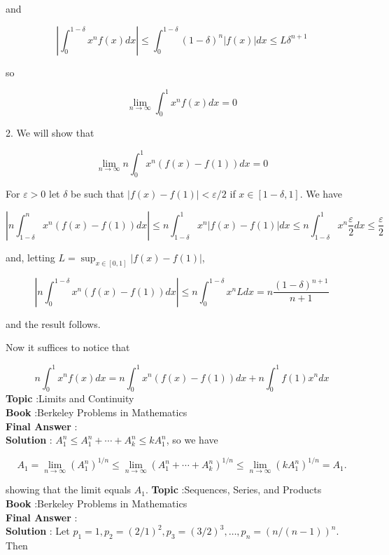 \documentclass[10pt]{article}
\begin{document}
and

$$
\left|\int_{0}^{1-\delta} x^{n} f(x) d x\right| \leqslant \int_{0}^{1-\delta}(1-\delta)^{n}|f(x)| d x \leqslant L \delta^{n+1}
$$

so

$$
\lim _{n \rightarrow \infty} \int_{0}^{1} x^{n} f(x) d x=0
$$

2. We will show that

$$
\lim _{n \rightarrow \infty} n \int_{0}^{1} x^{n}(f(x)-f(1)) d x=0
$$

For $\varepsilon>0$ let $\delta$ be such that $|f(x)-f(1)|<\varepsilon / 2$ if $x \in[1-\delta, 1]$. We have

$$
\left|n \int_{1-\delta}^{n} x^{n}(f(x)-f(1)) d x\right| \leqslant n \int_{1-\delta}^{1} x^{n}|f(x)-f(1)| d x \leqslant n \int_{1-\delta}^{1} x^{n} \frac{\varepsilon}{2} d x \leqslant \frac{\varepsilon}{2}
$$

and, letting $L=\sup _{x \in[0,1]}|f(x)-f(1)|$,

$$
\left|n \int_{0}^{1-\delta} x^{n}(f(x)-f(1)) d x\right| \leqslant n \int_{0}^{1-\delta} x^{n} L d x=n \frac{(1-\delta)^{n+1}}{n+1}
$$

and the result follows.

Now it suffices to notice that

$$
n \int_{0}^{1} x^{n} f(x) d x=n \int_{0}^{1} x^{n}(f(x)-f(1)) d x+n \int_{0}^{1} f(1) x^{n} d x
$$
\textbf{Topic} :Limits and Continuity \\
\textbf{Book} :Berkeley Problems in Mathematics\\
\textbf{Final Answer} :\\


\textbf{Solution} : $A_{1}^{n} \leqslant A_{1}^{n}+\cdots+A_{k}^{n} \leqslant k A_{1}^{n}$, so we have

$$
A_{1}=\lim _{n \rightarrow \infty}\left(A_{1}^{n}\right)^{1 / n} \leqslant \lim _{n \rightarrow \infty}\left(A_{1}^{n}+\cdots+A_{k}^{n}\right)^{1 / n} \leqslant \lim _{n \rightarrow \infty}\left(k A_{1}^{n}\right)^{1 / n}=A_{1} .
$$

showing that the limit equals $A_{1}$.
\textbf{Topic} :Sequences, Series, and Products \\
\textbf{Book} :Berkeley Problems in Mathematics\\
\textbf{Final Answer} :\\


\textbf{Solution} : Let $p_{1}=1, p_{2}=(2 / 1)^{2}, p_{3}=(3 / 2)^{3}, \ldots, p_{n}=(n /(n-1))^{n}$. Then
\end{document}
